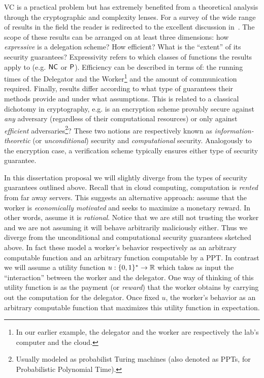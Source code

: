 {VC is a practical problem but has extremely benefited from a theoretical analysis through the cryptographic and complexity lenses. For a survey of the wide range of results in the field the reader is redirected to the excellent discussion in~\cite{wb15}. %
 The scope of these results can be arranged on at least three dimensions: how \textit{expressive} is a delegation scheme? How   efficient? What is the ``extent'' of its security guarantees?
 Expressivity refers to which classes of functions the results apply to (e.g. $\NC$ or $\P$).
 Efficiency can be described in terms of: the running times of the Delegator and the Worker\footnote{In our earlier example, the delegator and the worker are respectively the lab's computer and the cloud.} and the amount of communication required. Finally, results differ according to what type of guarantees their methods provide and under what assumptions. This is related to a classical dichotomy in cryptography, e.g. is an encryption scheme provably secure against \textit{any} adversary (regardless of their computational resources) or only against \textit{efficient} adversaries\footnote{Usually modeled as probabilist Turing machines (also denoted as PPTs, for Probabilistic Polynomial Time).}? These two notions are respectively known as \textit{information-theoretic} (or \textit{unconditional}) security and \textit{computational} security. Analogously to the encryption case, a verification scheme typically ensures either type of security guarantee. 

In this dissertation proposal we will slightly diverge from the types of security guarantees outlined above. Recall that in cloud computing, computation is \textit{rented} from far away servers. This suggests an alternative approach: assume that the worker is \textit{economically motivated} and seeks to maximize a monetary reward. In other words, assume it is \textit{rational}. Notice that we are still not trusting the worker and we are not assuming it will behave arbitrarily maliciously either. Thus we diverge from the unconditional and computational security guarantees sketched above. In fact these model a worker's behavior respectively as an arbitrary computable function and an arbitrary function computable by a PPT. In contrast we will assume a utility function $u: \bits \to \reals$ which takes as input the ``interaction'' between the worker and the delegator. One way of thinking of this utility function is as the payment (or \textit{reward}) that the worker obtains by carrying out the computation for the delegator. Once fixed $u$, the worker's behavior as an arbitrary computable function that maximizes this utility function in expectation.


}
